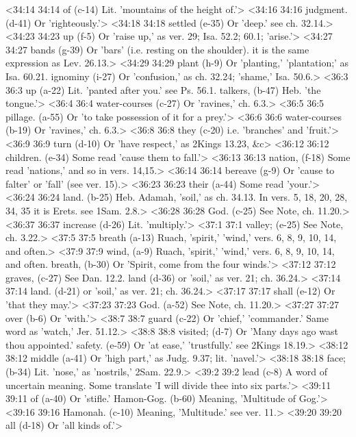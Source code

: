<34:14 34:14  of (c-14)  Lit. 'mountains of the height of.'>
<34:16 34:16  judgment. (d-41)  Or 'righteously.'>
<34:18 34:18  settled (e-35)  Or 'deep.' see ch. 32.14.>
<34:23 34:23  up (f-5)  Or 'raise up,' as ver. 29; Isa. 52.2; 60.1; 'arise.'>
<34:27 34:27  bands (g-39)  Or 'bars' (i.e. resting on the shoulder). it is the same  expression as Lev. 26.13.>
<34:29 34:29  plant (h-9)  Or 'planting,' 'plantation;' as Isa. 60.21.
  ignominy (i-27)  Or 'confusion,' as ch. 32.24; 'shame,' Isa. 50.6.>
<36:3 36:3  up (a-22)  Lit. 'panted after you.' see Ps. 56.1.
  talkers, (b-47)  Heb. 'the tongue.'>
<36:4 36:4  water-courses (c-27)  Or 'ravines,' ch. 6.3.>
<36:5 36:5  pillage. (a-55)  Or 'to take possession of it for a prey.'>
<36:6 36:6  water-courses (b-19)  Or 'ravines,' ch. 6.3.>
<36:8 36:8  they (c-20)  i.e. 'branches' and 'fruit.'>
<36:9 36:9  turn (d-10)  Or 'have respect,' as 2Kings 13.23, &c>
<36:12 36:12  children. (e-34)  Some read 'cause them to fall.'>
<36:13 36:13  nation, (f-18)  Some read 'nations,' and so in vers. 14,15.>
<36:14 36:14  bereave (g-9)  Or 'cause to falter' or 'fall' (see ver. 15).>
<36:23 36:23  their (a-44)  Some read 'your.'>
<36:24 36:24  land. (b-25)  Heb. Adamah, 'soil,' as ch. 34.13. In vers.  5, 18, 20, 28, 34, 35 it is Erets. see 1Sam. 2.8.>
<36:28 36:28  God. (c-25)  See Note, ch. 11.20.>
<36:37 36:37  increase (d-26)  Lit. 'multiply.'>
<37:1 37:1  valley; (e-25)  See Note, ch. 3.22.>
<37:5 37:5  breath (a-13)  Ruach, 'spirit,' 'wind,' vers. 6, 8, 9, 10, 14, and often.>
<37:9 37:9  wind, (a-9)  Ruach, 'spirit,' 'wind,' vers. 6, 8, 9, 10, 14, and often.
  breath, (b-30)  Or 'Spirit, come from the four winds.'>
<37:12 37:12  graves, (c-27)  See Dan. 12.2.
  land (d-36) or 'soil,' as ver. 21; ch. 36.24.>
<37:14 37:14  land. (d-21)  or 'soil,' as ver. 21; ch. 36.24.>
<37:17 37:17  shall (e-12)  Or 'that they may.'>
<37:23 37:23  God. (a-52)  See Note, ch. 11.20.>
<37:27 37:27  over (b-6)  Or 'with.'>
<38:7 38:7  guard (c-22)  Or 'chief,' 'commander.' Same word as 'watch,' Jer. 51.12.>
<38:8 38:8  visited; (d-7)  Or 'Many days ago wast thou appointed.'
  safety. (e-59)  Or 'at ease,' 'trustfully.' see 2Kings 18.19.>
<38:12 38:12  middle (a-41)  Or 'high part,' as Judg. 9.37; lit. 'navel.'>
<38:18 38:18  face; (b-34)  Lit. 'nose,' as 'nostrils,' 2Sam. 22.9.>
<39:2 39:2  lead (c-8)  A word of uncertain meaning. Some translate 'I will divide  thee into six parts.'>
<39:11 39:11  of (a-40)  Or 'stifle.'
  Hamon-Gog. (b-60)  Meaning, 'Multitude of Gog.'>
<39:16 39:16  Hamonah. (c-10)  Meaning, 'Multitude.' see ver. 11.>
<39:20 39:20  all (d-18)  Or 'all kinds of.'>
